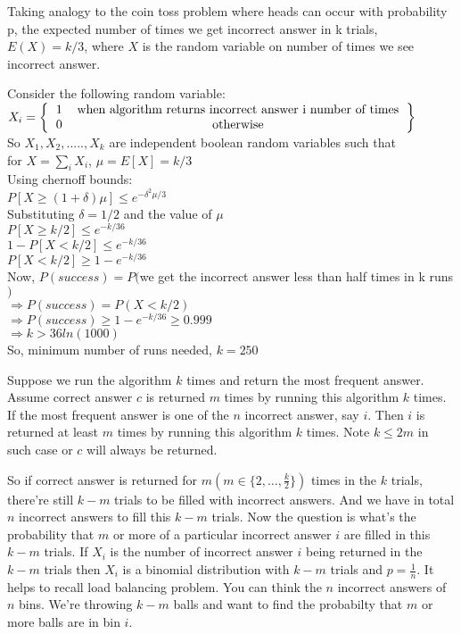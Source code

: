 \documentclass[11pt]{article}
\begin{document}
Taking analogy to the coin toss problem where heads can occur with probability p, the expected number of times we get incorrect answer
in k trials, $E(X) = k/3$, where $X$ is the random variable on number of times we see incorrect answer.

Consider the following random variable: \\
$X_i = \left \{
\begin{tabular}{cc}
1 & when algorithm returns incorrect answer i number of times \\
0 & otherwise
\end{tabular}
\right \}$ \\
So $X_1, X_2,.....,X_k$ are independent boolean random variables such that \\
for $X = \sum_{i} X_i$, $\mu = E[X] = k/3$ \\
Using chernoff bounds: \\
$P[X \geq (1+\delta)\mu] \leq e^{-\delta^2 \mu/3}$ \\
Substituting $\delta = 1/2$ and the value of $\mu$ \\
$P[X \geq k/2] \leq e^{-k/36}$ \\
$1 - P[X < k/2] \leq e^{-k/36}$ \\
$P[X < k/2] \geq 1 - e^{-k/36}$ \\
Now, $P(success) = P($we get the incorrect answer less than half times in k runs$)$ \\
$\Rightarrow P(success) = P(X < k/2)$ \\
$\Rightarrow P(success) \geq 1 - e^{-k/36} \geq 0.999$ \\
$\Rightarrow k > 36ln(1000)$ \\
So, minimum number of runs needed, $k = 250$

\newpage


\noindent Suppose we run the algorithm $k$ times and return the most frequent answer.
Assume correct answer $c$ is returned $m$ times by running this algorithm $k$ times.
If the most frequent answer is one of the $n$ incorrect answer, say $i$.
Then $i$ is returned at least $m$ times by running this algorithm $k$ times.
Note $k \le 2m$ in such case or $c$ will always be returned.

\noindent So if correct answer is returned for $m(m \in \{2, \dots, \frac{k}{2}\})$ times in the $k$ trials, there're still $k-m$ trials to be filled with incorrect answers. 
And we have in total $n$ incorrect answers to fill this $k-m$ trials.
Now the question is what's the probability that $m$ or more of a particular incorrect answer $i$ are filled in this $k-m$ trials.
If $X_i$ is the number of incorrect answer $i$ being returned in the $k-m$ trials then $X_i$ is a binomial distribution with $k-m$ trials and $p = \frac{1}{n}$.
It helps to recall load balancing problem.
You can think the $n$ incorrect answers of $n$ bins.
We're throwing $k-m$ balls and want to find the probabilty that $m$ or more balls are in bin $i$.
\\
\end{document}
